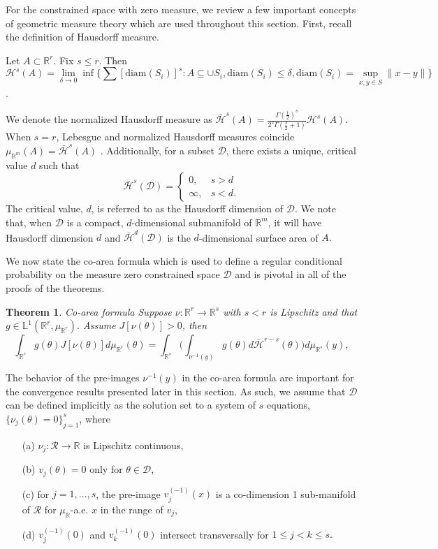 \documentclass[10pt,fleqn]{article} \pdfoutput=1
\newtheorem{theorem}{Theorem} \newtheorem{lemma}{Lemma}
\newcommand{\bb}[1]{\mathbb{#1}} \newcommand{\mc}[1]{\mathcal{#1}}
\DeclareMathOperator{\1}{\mathbbm{1}} \DeclareMathOperator{\bigO}{\mc O}
\begin{document}
For the constrained space with zero measure, we review a few important concepts of
geometric measure theory which are used throughout this section.  First,
recall the definition of Hausdorff measure.  \begin{Hausdorff_def} Let
$A\subset \bb R^r$. Fix $s \le r$. Then $$\mc H^{s}(A)=
\underset{\delta\rightarrow 0}\lim \inf \bigg\{ \sum
\left[{\text{diam}(S_i)}\right]^s: {A\subseteq \cup S_i,
\text{diam}(S_i)\le \delta}, \text{diam}(S_i)=\sup_{x,y\in
S}\|x-y\|\bigg\}$$.  \end{Hausdorff_def} We denote the normalized Hausdorff
measure as $\bar{\mc H}^{s}(A) =\frac{\Gamma(\frac{1}{2})^{s}}{2^s
\Gamma(\frac{s}{2}+1)} \mc H^{s}(A)$. When $s=r$, Lebesgue and normalized
Hausdorff measures coincide  $\mu_{\mathbb{R}^m}(A)= \bar{\mc H}^{s}(A)$
\citep{evans2015measure}.  Additionally, for a subset $\mathcal{D}$, there
exists a unique, critical value $d$ such that
$$\bar{\mathcal{H}}^s(\mathcal{D}) = \begin{cases} 0, & s > d \\ \infty, &
s < d.\end{cases}$$ The critical value, $d$, is referred to as the
Hausdorff dimension of $\mathcal{D}$. We note that, when $\mathcal{D}$ is a
compact, $d$-dimensional submanifold of $\mathbb{R}^m$, it will have
Hausdorff dimension $d$ and $\bar{\mathcal{H}}^d(\mathcal{D})$ is the
$d$-dimensional surface area of $A.$

We now state the co-area formula which is used to define a regular
conditional probability on the measure zero constrained space $\mathcal{D}$
and is pivotal in all of the proofs of the theorems.
\begin{theorem}{Co-area formula \citep{diaconis2013manifold,
federer2014geometric}} Suppose $\nu:\mathbb{R}^r\to\mathbb{R}^s$
with $ s<r$ is Lipschitz and that
$g\in\mathbb{L}^1(\mathbb{R}^r,\mu_{\mathbb{R}^r}).$ Assume
$J[\nu(\theta)]>0$, then \begin{equation} \int_{\mathbb{R}^r}
g(\theta)J[\nu(\theta)]d\mu_{\mathbb{R}^r}( \theta)=
\int_{\mathbb{R}^s} \bigg( \int_{\nu^{-1}(y)}g(\theta)
d\bar{\mathcal{H}}^{r-s}(\theta)\bigg)d\mu_{\mathbb{R}^s}(y),
\end{equation} \end{theorem} The behavior of the pre-images
$\nu^{-1}(y)$ in the co-area formula are important for the
convergence results presented later in this section.  As such, we assume that $\mathcal{D}$ can be defined implicitly as the
solution set to a system of $s$ equations,  $\{\nu_j(\theta)=0\}_{j=1}^s$,
where \begin{itemize} \item[(a)] $\nu_j:\mathcal{R}\to\mathbb{R}$ is
Lipschitz continuous, \item[(b)] $v_j(\theta)=0$ only for
$\theta\in\mathcal{D}$, \item[(c)] for $j=1,\dots, s$, the
pre-image
$v_j^{(-1)}(x)$ is a co-dimension 1 sub-manifold of $\mathcal{R}$
for $\mu_\mathbb{R}$-a.e. $x$ in the range of $v_j$, \item[(d)]
$v_j^{(-1)}(0)$ and $v_k^{(-1)}(0)$ intersect transversally for
$1\le j<k\le s.$ \end{itemize}
\end{document}
